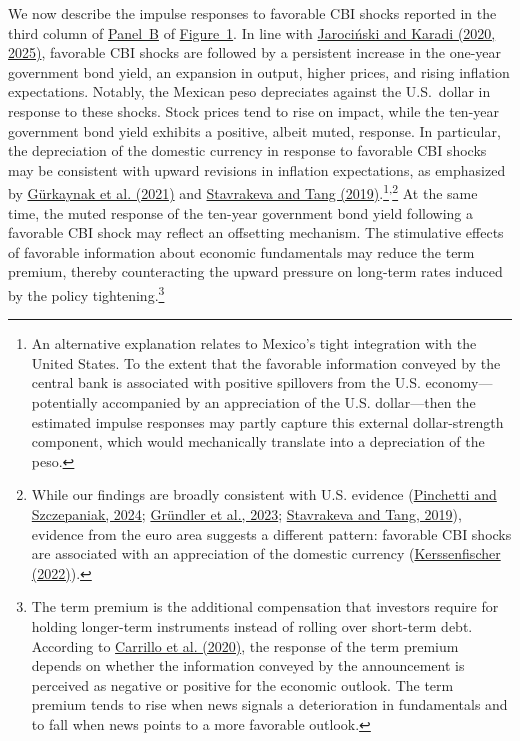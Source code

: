 \documentclass[12pt, reqno]{article}
\begin{document}
We now describe the impulse responses to favorable CBI shocks reported in the third column of \hyperlink{Panel BF1}{Panel~B} of \hyperlink{Figure~1}{Figure~1}. In line with \hyperlink{Jarociński and Karadi (2025)}{Jarociński and Karadi (2020, 2025)}, favorable CBI shocks are followed by a persistent increase in the one-year government bond yield, an expansion in output, higher prices, and rising inflation expectations. Notably, the Mexican peso depreciates against the U.S.\ dollar in response to these shocks. Stock prices tend to rise on impact, while the ten-year government bond yield exhibits a positive, albeit muted, response. In particular, the depreciation of the domestic currency in response to favorable CBI shocks may be consistent with upward revisions in inflation expectations, as emphasized by \hyperlink{Gurkaynak et al. (2021)}{G\"urkaynak et al. (2021)} and \hyperlink{Stavrakeva and Tang (2019)}{Stavrakeva and Tang (2019)}.\footnote{An alternative explanation relates to Mexico’s tight integration with the United States. To the extent that the favorable information conveyed by the central bank is associated with positive spillovers from the U.S. economy—potentially accompanied by an appreciation of the U.S. dollar—then the estimated impulse responses may partly capture this external dollar-strength component, which would mechanically translate into a depreciation of the peso.}\textsuperscript{,}\footnote{While our findings are broadly consistent with U.S. evidence (\hyperlink{Pinchetti and Szczepaniak (2024)}{Pinchetti and Szczepaniak, 2024}; \hyperlink{Gründler et al. (2023)}{Gr\"undler et al., 2023}; \hyperlink{Stavrakeva and Tang (2019)}{Stavrakeva and Tang, 2019}), evidence from the euro area suggests a different pattern: favorable CBI shocks are associated with an appreciation of the domestic currency (\hyperlink{Kerssenfischer (2022)}{Kerssenfischer (2022)}).}  At the same time, the muted response of the ten-year government bond yield following a favorable CBI shock may reflect an offsetting mechanism. The stimulative effects of favorable information about economic fundamentals may reduce the term premium, thereby counteracting the upward pressure on long-term rates induced by the policy tightening.\footnote{The term premium is the additional compensation that investors require for holding longer-term instruments instead of rolling over short-term debt. According to \hyperlink{Carrillo et al. (2020)}{Carrillo et al. (2020)}, the response of the term premium depends on whether the information conveyed by the announcement is perceived as negative or positive for the economic outlook. The term premium tends to rise when news signals a deterioration in fundamentals and to fall when news points to a more favorable outlook.}
\end{document}
